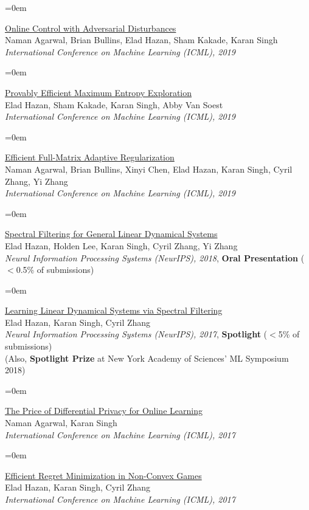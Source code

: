 \documentclass{scrartcl}
\newcommand{\Description}[1]{\hangindent=0em\hangafter=0\noindent\raggedright {#1}\par\normalsize\vspace{1em}}
\begin{document}
\begin{cv}{}
\Description{\href{http://proceedings.mlr.press/v97/agarwal19c/agarwal19c.pdf}{Online Control with Adversarial Disturbances} \\Naman Agarwal, Brian Bullins, Elad Hazan, Sham Kakade, Karan Singh\\ \textit{International Conference on Machine Learning (ICML), 2019}}


\Description{\href{http://proceedings.mlr.press/v97/hazan19a/hazan19a.pdf}{Provably Efficient Maximum Entropy Exploration}\\ Elad Hazan, Sham Kakade, Karan Singh, Abby Van Soest \\ \textit{International Conference on Machine Learning (ICML), 2019}}

\Description{\href{http://proceedings.mlr.press/v97/agarwal19b/agarwal19b.pdf}{Efficient Full-Matrix Adaptive Regularization} \\ Naman Agarwal, Brian Bullins, Xinyi Chen, Elad Hazan, Karan Singh, Cyril Zhang, Yi Zhang \\ \textit{International Conference on Machine Learning (ICML), 2019}}

\Description{\href{https://papers.nips.cc/paper/7714-spectral-filtering-for-general-linear-dynamical-systems.pdf}{Spectral Filtering for General Linear Dynamical Systems} \\Elad Hazan, Holden Lee, Karan Singh, Cyril Zhang, Yi Zhang\\ \textit{Neural Information Processing Systems (NeurIPS), 2018}, \textbf{Oral Presentation} ($<$0.5\% of submissions)}
\newpage

\Description{\href{https://papers.nips.cc/paper/7247-learning-linear-dynamical-systems-via-spectral-filtering.pdf}{Learning Linear Dynamical Systems via Spectral Filtering}\\ Elad Hazan, Karan Singh, Cyril Zhang\\ \textit{Neural Information Processing Systems (NeurIPS), 2017}, \textbf{Spotlight} ($<$5\% of submissions)\\ (Also, \textbf{Spotlight Prize} at New York Academy of Sciences' ML Symposium 2018)}

\Description{\href{http://proceedings.mlr.press/v70/agarwal17a/agarwal17a.pdf}{The Price of Differential Privacy for Online Learning}  \\ Naman Agarwal, Karan Singh \\ \textit{International Conference on Machine Learning (ICML), 2017}}


\Description{\href{http://proceedings.mlr.press/v70/hazan17a/hazan17a.pdf}{Efficient Regret Minimization in Non-Convex Games}\\ Elad Hazan, Karan Singh, Cyril Zhang  \\ \textit{International Conference on Machine Learning (ICML), 2017}}


\end{cv}
\end{document}
